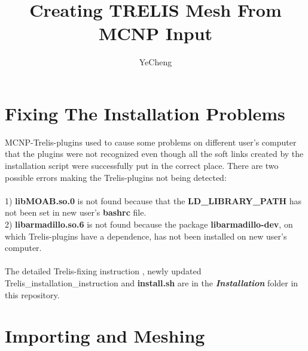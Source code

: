 \documentclass[a4paper]{article}
\title{Creating TRELIS Mesh From MCNP Input}
\author{YeCheng}
\begin{document}
\maketitle



\section{Fixing The Installation Problems}
MCNP-Trelis-plugins used to cause some problems on different user's computer that the plugins were not recognized even though all the soft links created by
the installation script were successfully put in the correct place. There are two possible errors making the Trelis-plugins not being detected: \\ \\
1) \textbf{libMOAB.so.0} is not found because that the \textbf{LD\_LIBRARY\_PATH} has not been set in new user's \textbf{bashrc} file.\\
2) \textbf{libarmadillo.so.6} is not found because the package \textbf{libarmadillo-dev}, on which Trelis-plugins have a dependence, has not been
   installed on new user's computer.\\ \\
The detailed Trelis-fixing instruction , newly updated Trelis\_installation\_instruction and \textbf{install.sh} are in the \textbf{\textit{Installation}} folder in this
repository.



\section{Importing and Meshing}
\end{document}

